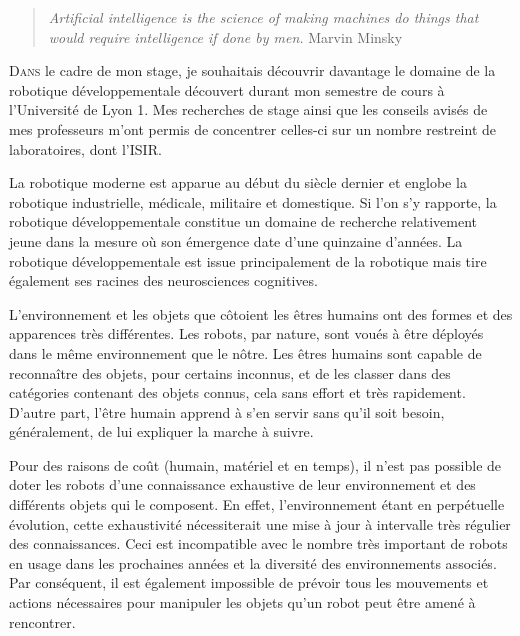 \documentclass[draft]{llncs}
\begin{document}


 \begin{quotation}
  \textit{Artificial intelligence is the science of making machines do things that would require intelligence if done by men.} Marvin Minsky
 \end{quotation}

 
\lettrine{D}{ans} le cadre de mon stage, je souhaitais découvrir davantage le domaine de la robotique développementale découvert durant mon semestre de cours à l'Université de Lyon 1.
Mes recherches de stage ainsi que les conseils avisés de mes professeurs m'ont permis de concentrer celles-ci sur un nombre restreint de laboratoires, dont l'ISIR.

La robotique moderne est apparue au début du siècle dernier et englobe la robotique industrielle, médicale, militaire et domestique.
Si l'on s'y rapporte, la robotique développementale constitue un domaine de recherche relativement jeune dans la mesure où son émergence date d'une quinzaine d'années.
La robotique développementale est issue principalement de la robotique mais tire également ses racines des neurosciences cognitives.

L'environnement et les objets que côtoient les êtres humains ont des formes et des apparences très différentes.
Les robots, par nature, sont voués à être déployés dans le même environnement que le nôtre.
Les êtres humains sont capable de reconnaître des objets, pour certains inconnus, et de les classer dans des catégories contenant des objets connus, cela sans effort et très rapidement.
D'autre part, l'être humain apprend à s'en servir sans qu'il soit besoin, généralement, de lui expliquer la marche à suivre.

Pour des raisons de coût (humain, matériel et en temps), il n'est pas possible de doter les robots d'une connaissance exhaustive de leur environnement et des différents objets qui le composent.
En effet, l'environnement étant en perpétuelle évolution, cette exhaustivité nécessiterait une mise à jour à intervalle très régulier des connaissances.
Ceci est incompatible avec le nombre très important de robots en usage dans les prochaines années et la diversité des environnements associés.
Par conséquent, il est également impossible de prévoir tous les mouvements et actions nécessaires pour manipuler les objets qu'un robot peut être amené à rencontrer.
\end{document}
